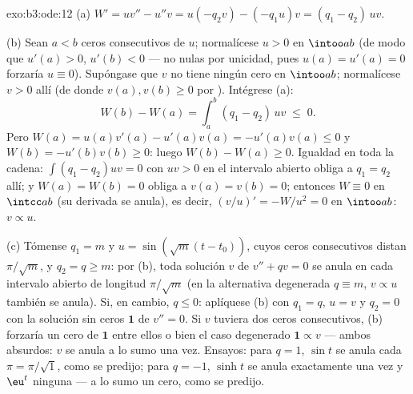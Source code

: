 \begin{solution}{exo:b3:ode:12}
(a) $W' = uv'' - u''v = u(-q_2v) - (-q_1u)v = (q_1 -
q_2)\,uv$.

(b) Sean $a < b$ ceros consecutivos de $u$; normalícese $u >
0$ en $\intoo ab$ (de modo que $u'(a) > 0$, $u'(b) < 0$ --- no nulas por
unicidad, pues $u(a) = u'(a) = 0$ forzaría $u
\equiv 0$). Supóngase que $v$ no tiene ningún cero en $\intoo ab$;
normalícese $v > 0$ allí (de donde $v(a), v(b) \geq 0$ por
). Intégrese (a):
\[
W(b) - W(a) = \int_a^b(q_1 - q_2)\,uv \;\leq\; 0 .
\]
Pero $W(a) = u(a)v'(a) - u'(a)v(a) = -u'(a)v(a) \leq 0$ y
$W(b) = -u'(b)v(b) \geq 0$: luego $W(b) - W(a) \geq 0$. Igualdad en toda
la cadena: $\int(q_1 - q_2)uv = 0$ con $uv > 0$ en el intervalo abierto
obliga a $q_1 = q_2$ allí; y $W(a) =
W(b) = 0$ obliga a $v(a) = v(b) = 0$; entonces $W \equiv 0$ en
$\intcc ab$ (su derivada se anula), es decir, $(v/u)' = -W/u^2 = 0$ en
$\intoo ab$: $v \propto u$.

(c) Tómense $q_1 = m$ y $u = \sin(\sqrt m(t - t_0))$, cuyos ceros
consecutivos distan $\pi/\sqrt m$, y $q_2 = q \geq
m$: por (b), toda solución $v$ de $v'' + qv = 0$ se anula en cada
intervalo abierto de longitud $\pi/\sqrt m$ (en la alternativa
degenerada $q \equiv m$, $v \propto u$ también se anula). Si, en cambio,
$q \leq 0$: aplíquese (b) con $q_1 = q$, $u =
v$ y $q_2 = 0$ con la solución sin ceros $\mathbf 1$ de $v'' = 0$. Si
$v$ tuviera dos ceros consecutivos, (b) forzaría un cero de $\mathbf 1$
entre ellos o bien el caso degenerado $\mathbf 1 \propto v$ --- ambos
absurdos: $v$ se anula a lo sumo una vez. Ensayos: para $q = 1$,
$\sin t$ se anula cada $\pi
= \pi/\sqrt1$, como se predijo; para $q = -1$, $\sinh t$ se anula
exactamente una vez y $\eu^t$ ninguna --- a lo sumo un cero, como se
predijo.
\end{solution}

